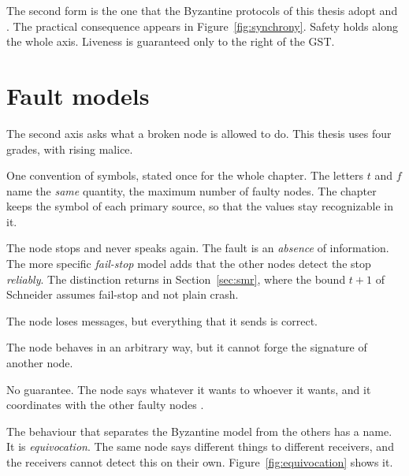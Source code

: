 The second form is the one that the Byzantine protocols of this thesis
adopt \cite{yin2019hotstuff} and \cite{malkhi2023hotstuff2}\prep. The
practical consequence appears in Figure~\ref{fig:synchrony}. Safety
holds along the whole axis. Liveness is guaranteed only to the right of
the GST.

\section{Fault models}
\label{sec:faults}

The second axis asks what a broken node is allowed to do. This thesis
uses four grades, with rising malice.

One convention of symbols, stated once for the whole chapter. The
letters $t$ and $f$ name the \emph{same} quantity, the maximum number of
faulty nodes. The chapter keeps the symbol of each primary source, so
that the values stay recognizable in it.

\begin{description}[leftmargin=2.2em,style=nextline,font=\normalfont\bfseries]
  \item[Crash.] The node stops and never speaks again. The fault is an
  \emph{absence} of information. The more specific \emph{fail-stop}
  model adds that the other nodes detect the stop \emph{reliably}. The
  distinction returns in Section~\ref{sec:smr}, where the bound $t{+}1$
  of Schneider assumes fail-stop and not plain crash.
  \item[Omission.] The node loses messages, but everything that it sends
  is correct.
  \item[Byzantine with authentication.] The node behaves in an arbitrary
  way, but it cannot forge the signature of another node.
  \item[Byzantine without authentication.] No guarantee. The node says
  whatever it wants to whoever it wants, and it coordinates with the
  other faulty nodes \cite{lamport1982byzantine}.
\end{description}

The behaviour that separates the Byzantine model from the others has a
name. It is \emph{equivocation}. The same node says different things to
different receivers, and the receivers cannot detect this on their own.
Figure~\ref{fig:equivocation} shows it.

